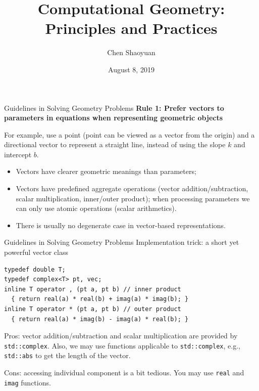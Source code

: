 \documentclass{beamer}
\title{Computational Geometry: \\ Principles and Practices}
\institute{Nanjing University ICPC Training Team}
\author{Chen Shaoyuan}
\date{August 8, 2019}
\begin{document}
\begin{frame}
  \titlepage
\end{frame}

\begin{frame}{Guidelines in Solving Geometry Problems}
	\textbf{Rule 1: Prefer vectors to parameters in equations when representing geometric objects}
	
	 For example, use a point (point can be viewed as a vector from the origin) and a directional vector to represent a straight line, instead of using the slope $k$ and intercept $b$.
	 
	 \pause
    \begin{itemize}[<+->]
		\item Vectors have clearer geometric meanings than parameters;
		\item Vectors have predefined aggregate operations (vector addition/subtraction, scalar multiplication, inner/outer product); when processing parameters we can only use atomic operations (scalar arithmetics).
		\item There is usually no degenerate case in vector-based representations.
	\end{itemize}
\end{frame}

\begin{frame}[fragile]{Guidelines in Solving Geometry Problems}
    Implementation trick: a short yet powerful vector class
    
\begin{lstlisting}
typedef double T;
typedef complex<T> pt, vec;
inline T operator , (pt a, pt b) // inner product
  { return real(a) * real(b) + imag(a) * imag(b); }
inline T operator * (pt a, pt b) // outer product
  { return real(a) * imag(b) - imag(a) * real(b); }
\end{lstlisting}

\pause

Pros: vector addition/subtraction and scalar multiplication are provided by \lstinline|std::complex|. Also, we may use functions applicable to \lstinline|std::complex|, e.g., \lstinline|std::abs| to get the length of the vector.

Cons: accessing individual component is a bit tedious. You may use \lstinline|real| and \lstinline|imag| functions.
\end{frame}
\end{document}
